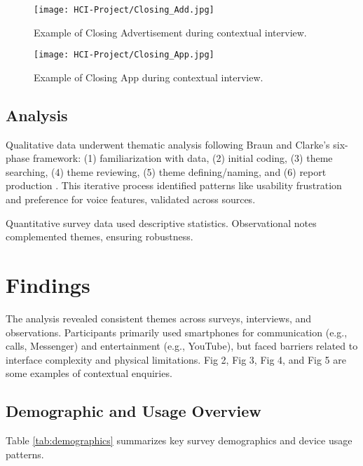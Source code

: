 \documentclass[acmlarge]{acmart}
\begin{document}
\begin{figure}[h]
    \centering
    \begin{minipage}{0.35\textwidth}
        \centering
        \texttt{[image: HCI-Project/Closing\_Add.jpg]}
        \caption{Example of Closing Advertisement during contextual interview.}
        \label{fig:leftimage}
    \end{minipage}\hfill
    \begin{minipage}{0.35\textwidth}
        \centering
        \texttt{[image: HCI-Project/Closing\_App.jpg]}
        \caption{Example of Closing App during contextual interview.}
        \label{fig:centerimage}
    \end{minipage}
\end{figure}

\subsection{Analysis}
Qualitative data underwent thematic analysis following Braun and Clarke's six-phase framework: (1) familiarization with data, (2) initial coding, (3) theme searching, (4) theme reviewing, (5) theme defining/naming, and (6) report production \cite{braun2006thematic}. This iterative process identified patterns like usability frustration and preference for voice features, validated across sources.

Quantitative survey data used descriptive statistics. Observational notes complemented themes, ensuring robustness.

\section{Findings}
The analysis revealed consistent themes across surveys, interviews, and observations. Participants primarily used smartphones for communication (e.g., calls, Messenger) and entertainment (e.g., YouTube), but faced barriers related to interface complexity and physical limitations. Fig 2, Fig 3, Fig 4, and Fig 5 are some examples of contextual enquiries.

\subsection{Demographic and Usage Overview}
Table \ref{tab:demographics} summarizes key survey demographics and device usage patterns.
\end{document}
